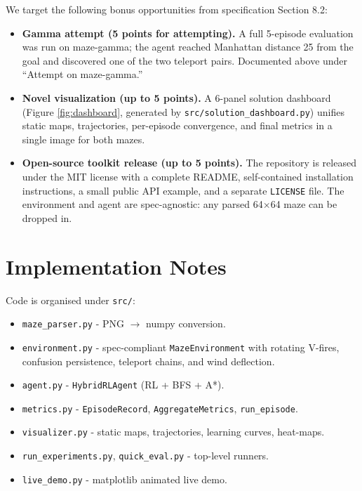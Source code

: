 \documentclass[11pt]{article}
\begin{document}
We target the following bonus opportunities from specification
Section 8.2:
\begin{itemize}[itemsep=0.2em]
  \item \textbf{Gamma attempt (5 points for attempting).}  A full
    5-episode evaluation was run on maze-gamma; the agent reached
    Manhattan distance 25 from the goal and discovered one of the
    two teleport pairs.  Documented above under ``Attempt on
    maze-gamma.''
  \item \textbf{Novel visualization (up to 5 points).}  A 6-panel
    solution dashboard (Figure \ref{fig:dashboard}, generated by
    \texttt{src/solution\_dashboard.py}) unifies static maps,
    trajectories, per-episode convergence, and final metrics in a
    single image for both mazes.
  \item \textbf{Open-source toolkit release (up to 5 points).}  The
    repository is released under the MIT license with a complete
    README, self-contained installation instructions, a small public
    API example, and a separate \texttt{LICENSE} file.  The
    environment and agent are spec-agnostic: any parsed 64$\times$64
    maze can be dropped in.
\end{itemize}

\section{Implementation Notes}

Code is organised under \texttt{src/}:
\begin{itemize}[itemsep=0.15em]
  \item \texttt{maze\_parser.py} - PNG $\to$ numpy conversion.
  \item \texttt{environment.py} - spec-compliant \texttt{MazeEnvironment}
    with rotating V-fires, confusion persistence, teleport chains, and
    wind deflection.
  \item \texttt{agent.py} - \texttt{HybridRLAgent} (RL + BFS + A*).
  \item \texttt{metrics.py} - \texttt{EpisodeRecord},
    \texttt{AggregateMetrics}, \texttt{run\_episode}.
  \item \texttt{visualizer.py} - static maps, trajectories, learning
    curves, heat-maps.
  \item \texttt{run\_experiments.py}, \texttt{quick\_eval.py} - top-level
    runners.
  \item \texttt{live\_demo.py} - matplotlib animated live demo.
\end{itemize}
\end{document}
